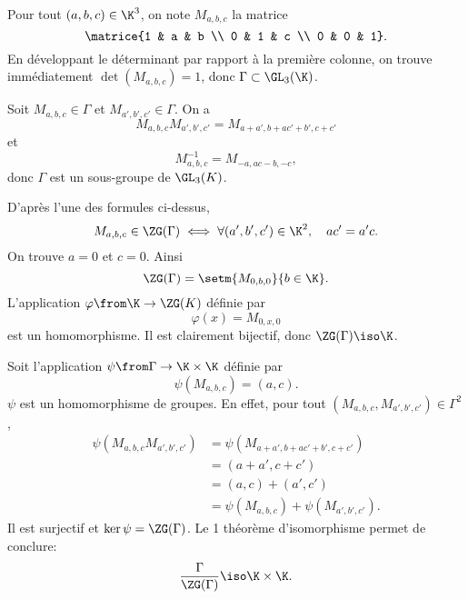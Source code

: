 Pour tout $(a,b,c)\in\K^3$, on note $M_{a,b,c}$ la matrice
\[
  \matrice{1 & a & b \\ 0 & 1 & c \\ 0 & 0 & 1}.
\]
En développant le déterminant par rapport à la première colonne, on trouve
immédiatement $\det(M_{a,b,c}) = 1$, donc $\Gamma\subset\GL_3(\K)$.

Soit $M_{a,b,c}\in\Gamma$ et $M_{a',b',c'}\in\Gamma$. On a
\[
  M_{a,b,c}M_{a',b',c'} = M_{a+a',b+ac'+b',c+c'}
\]
et
\[
  M_{a,b,c}^{-1} = M_{-a,ac-b,-c},
\]
donc $\Gamma$ est un sous-groupe de $\GL_3(K)$. 

D'après l'une des formules ci-dessus,
\[
  M_{a,b,c}\in\ZG(\Gamma) \iff \forall (a',b',c')\in\K^2,\quad ac' = a'c.
\]
On trouve $a=0$ et $c=0$. Ainsi 
\[
  \ZG(\Gamma) 
  = \setm{M_{0,b,0}}{b \in \K}.
\]
L'application $\varphi\from\K\to\ZG(K)$ définie par
%
\[
  \varphi(x) = M_{0,x,0}
\]
%
est un homomorphisme. Il est clairement bijectif, donc $\ZG(\Gamma) \iso \K$.

Soit l'application $\psi\from\Gamma\to\K\times\K$ définie par
%
\[
  \psi(M_{a,b,c}) = (a,c).
\]
%
$\psi$ est un homomorphisme de groupes. En effet, pour tout
$(M_{a,b,c},M_{a',b',c'})\in\Gamma^2$,
%
\begin{align*}
  \psi(M_{a,b,c}M_{a',b',c'}) 
  &= \psi(M_{a+a',b+ac'+b',c+c'}) \\
  &= (a+a',c+c') \\
  &= (a,c)+(a',c') \\
  &= \psi(M_{a,b,c})+\psi(M_{a',b',c'}).
\end{align*}
%
Il est surjectif et 
$\ker\psi = \ZG(\Gamma)$. Le 1 théorème d'isomorphisme permet 
de conclure: 
\[
  \frac{\Gamma}{\ZG(\Gamma)}\iso \K\times\K.
\]

